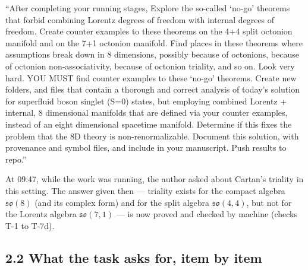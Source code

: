 \documentclass[
  10pt,
]{article}
\begin{document}
``After completing your running stages, Explore the so-called `no-go'
theorems that forbid combining Lorentz degrees of freedom with internal
degrees of freedom. Create counter examples to these theorems on the 4+4
split octonion manifold and on the 7+1 octonion manifold. Find places in
these theorems where assumptions break down in 8 dimensions, possibly
because of octonions, because of octonion non-associativity, because of
octonion triality, and so on. Look very hard. YOU MUST find counter
examples to these `no-go' theorems. Create new folders, and files that
contain a thorough and correct analysis of today's solution for
superfluid boson singlet (S=0) states, but employing combined Lorentz +
internal, 8 dimensional manifolds that are defined via your counter
examples, instead of an eight dimensional spacetime manifold. Determine
if this fixes the problem that the 8D theory is non-renormalizable.
Document this solution, with provenance and symbol files, and include in
your manuscript. Push results to repo.''

At 09:47, while the work was running, the author asked about Cartan's
triality in this setting. The answer given then --- triality exists for
the compact algebra \(\mathfrak{so}(8)\) (and its complex form) and for
the split algebra \(\mathfrak{so}(4,4)\), but not for the Lorentz
algebra \(\mathfrak{so}(7,1)\) --- is now proved and checked by machine
(checks T-1 to T-7d).

\hypertarget{what-the-task-asks-for-item-by-item}{%
\subsection{2.2 What the task asks for, item by
item}\label{what-the-task-asks-for-item-by-item}}
\end{document}
